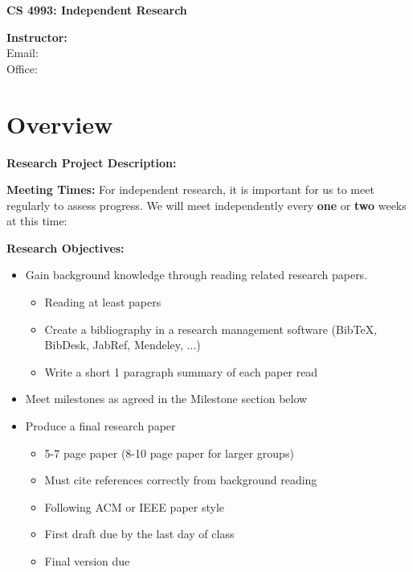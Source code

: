 \documentclass[12pt]{article}
\newcommand*{\field}[1]{
    \makebox[#1]{\hrulefill} 
}
\begin{document}
\textbf{CS 4993: Independent Research}

\textbf{Instructor:} \\
Email: \\ %
Office: \\ %

\section*{Overview}

\textbf{Research Project Description:} 

\noindent\hrulefill

\noindent\hrulefill

\noindent\hrulefill

\noindent\hrulefill

\noindent\hrulefill

\noindent\hrulefill


\textbf{Meeting Times:} For independent research, it is important for us to meet regularly to assess progress.  We will meet independently every \textbf{one} or \textbf{two} weeks at this time:

\field{3in}

\textbf{Research Objectives:} 
\begin{itemize}
    \item Gain background knowledge through reading related research papers.
        \begin{itemize}
            \item Reading at least \field{0.3in} papers
            \item Create a bibliography in a research management software (BibTeX, BibDesk, JabRef, Mendeley, ...)
            \item Write a short 1 paragraph summary of each paper read
        \end{itemize}
    \item Meet milestones as agreed in the Milestone section below
    \item Produce a final research paper
        \begin{itemize}
            \item 5-7 page paper (8-10 page paper for larger groups)
            \item Must cite references correctly from background reading
            \item Following ACM or IEEE paper style
            \item First draft due by the last day of class
            \item Final version due \field{1in}
        \end{itemize}
\end{itemize}
\end{document}
